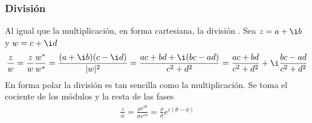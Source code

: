 \documentclass[letterpaper,10pt,english]{jupyterBook}
\begin{document}
\subsubsection{División}
\label{\detokenize{docs/Part_01_Formalismo/Chapter_01_02_Formalismo_matem_xe1tico/01_01_Numeros_Complejos_myst:division}}
\sphinxAtStartPar
Al igual que la multiplicación, en forma cartesiana, la división . Sea \(z = a+ \i b\) y \(w=c+\i d\)
\begin{equation*}
\begin{split}
\frac{z}{w} = \frac{z}{w}\frac{w^*}{w^*} = \frac{( a+ \i b)(c-\i d)}{|w|^2} = \frac{ac+bd + \i(bc-ad)}{c^2+d^2}  = \frac{ac+bd}{c^2+d^2} +\i\frac{bc-ad}{c^2+d^2}
\end{split}
\end{equation*}
\sphinxAtStartPar
En forma polar la división es tan sencilla como la multiplicación. Se toma el  cociente de los módulos y la resta de las fases
\begin{equation*}
\begin{split}
\frac{z}{w} = \frac{\rho e^{i\theta}}{\sigma e^{i\phi}} = \frac{\rho}{\sigma}
e^{i(\theta-\phi)}
\end{split}
\end{equation*}
\end{document}
